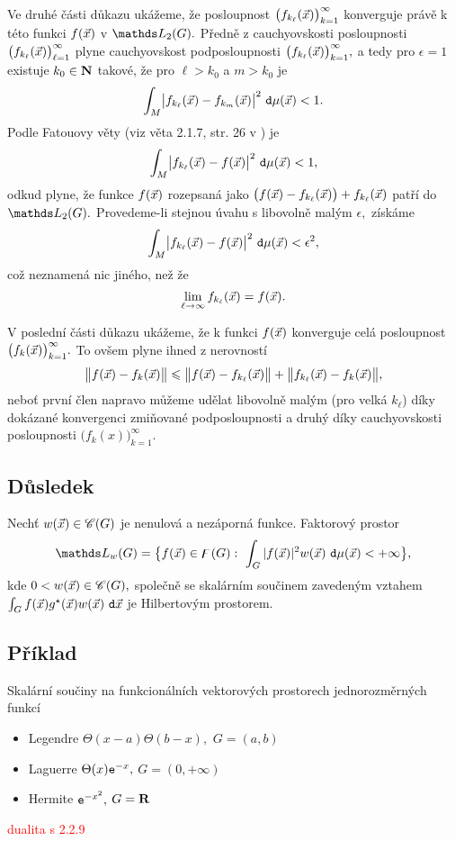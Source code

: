 Ve druh\'e \v c\'asti d\r ukazu uk\'a\v zeme, \v ze posloupnost
$\bigl(f_{k_\ell}({\vec{x}})\bigr)_{k=1}^\infty$  konverguje pr\'av\v e k
t\'eto funkci $f({\vec{x}})$ v $\LL_2(G).$ P\v redn\v e z cauchyovskosti
posloupnosti $\bigl(f_{k_\ell}({\vec{x}})\bigr)_{\ell=1}^\infty$  plyne
cauchyovskost podposloupnosti
$\bigl(f_{k_\ell}({\vec{x}})\bigr)_{k=1}^\infty,$ a tedy pro $\epsilon=1$
existuje $k_0\in{\mathbf N}$ takov\'e, \v ze pro $\ell>k_0$ a $m>k_0$ je
%
$$\int_M \bigl|f_{k_\ell}({\vec{x}})-f_{k_m}({\vec{x}})\bigr|^2~\mathtt{d}\mu({\vec{x}})<1.$$
%
Podle Fatouovy v\v ety (viz v\v eta 2.1.7, str. 26 v \cite{Krbalek_RMF}) je
%
$$\int_M \bigl|f_{k_\ell}({\vec{x}})-f({\vec{x}})\bigr|^2~\mathtt{d}\mu({\vec{x}})<1,$$
%
odkud plyne, \v ze funkce $f({\vec{x}})$ rozepsan\'a jako
$\bigl(f({\vec{x}})-f_{k_\ell}({\vec{x}})\bigr)+f_{k_\ell}({\vec{x}})$ pat\v r\'i do
$\LL_2(G).$ Provedeme-li stejnou \'uvahu s libovoln\v e mal\'ym
$\epsilon,$ z\'isk\'ame
%
$$\int_M \bigl|f_{k_\ell}({\vec{x}})-f({\vec{x}})\bigr|^2~\mathtt{d}\mu({\vec{x}})<\epsilon^2,$$
%
co\v z neznamen\'a nic jin\'eho, ne\v z \v ze
%
$$\lim_{\ell \rightarrow \infty} f_{k_\ell}({\vec{x}})=f({\vec{x}}).$$

V posledn\'i \v c\'asti d\r ukazu uk\'a\v zeme, \v ze k funkci
$f({\vec{x}})$ konverguje cel\'a posloupnost
$\bigl(f_k({\vec{x}})\bigr)_{k=1}^\infty.$ To ov\v sem plyne ihned z
nerovnost\'i
%
$$\bigl\|f({\vec{x}})-f_k({\vec{x}})\bigr\| \leqslant
\bigl\|f({\vec{x}})-f_{k_\ell}({\vec{x}})\bigr\| +
\bigl\|f_{k_\ell}({\vec{x}})-f_k({\vec{x}})\bigr\|,$$
%
nebo\v t prvn\'i \v clen napravo m\r u\v zeme ud\v elat libovoln\v
e mal\'ym (pro velk\'a $k_\ell$) d\'iky dok\'azan\'e konvergenci
zmi\v novan\'e podposloupnosti a druh\'y d\'iky cauchyovskosti
posloupnosti $\bigl(f_k(x)\bigr)_{k=1}^\infty.$

\subsection{D\r usledek}

Nech\v t $w({\vec{x}})\in\mathscr{C}(G)$ je nenulov\'a a nez\'aporn\'a funkce. Faktorov\'y prostor
%
$$\LL_w(G)=\bigl\{f(\x)\in\digamma(G):~\int_G |f(\x)|^2 w(\x)~\dmu(\x)<+\infty\bigr\},$$
%
kde $0<w({\vec{x}})\in\mathscr{C}(G),$ spole\v cn\v e se skal\'arn\'im sou\v cinem zaveden\'ym vztahem  $\int_G f({\vec{x}})g^\star({\vec{x}})w({\vec{x}})~\mathtt{d}{\vec{x}}$ je Hilbertov\'ym prostorem.\\

\subsection{P\v r\'iklad}
Skal\'arn\'i sou\v ciny na funkcion\'aln\'ich vektorov\'ych prostorech jednorozm\v ern\'ych funkc\'i
\begin{itemize} \item Legendre $\Theta(x-a)\Theta(b-x),$ $G=(a,b)$  \item Laguerre $\Theta(x)\mathtt{e}^{-x},$ $G=(0,+\infty)$ \item Hermite $\mathtt{e}^{-x^2},$ $G={\mathbf R}$
\end{itemize}
\textcolor{red}{dualita s 2.2.9}

